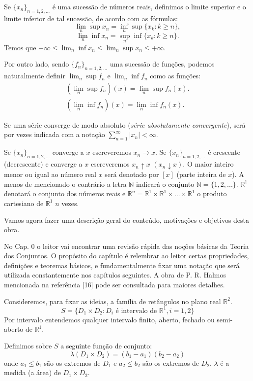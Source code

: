 \documentclass[
]{book}
\begin{document}
Se \(\{x_n\}_{n=1,2,...}\) é uma sucessão de números reais, definimos o limite superior e o limite inferior de tal sucessão, de acordo com as fórmulas: \[ \lim_n \sup x_n = \inf_n \sup \{x_k : k \ge n\}, \] \[ \lim_n \inf x_n = \sup_n \inf \{x_k : k \ge n\}. \] Temos que \(-\infty \le \lim_n \inf x_n \le \lim_n \sup x_n \le +\infty\).

Por outro lado, sendo \(\{f_n\}_{n=1,2,...}\) uma sucessão de funções, podemos naturalmente definir \(\lim_n \sup f_n\) e \(\lim_n \inf f_n\) como as funções: \[\begin{gathered} (\lim_n \sup f_n)(x) = \lim_n \sup f_n(x). \\ (\lim_n \inf f_n)(x) = \lim_n \inf f_n(x). \end{gathered} \]

Se uma série converge de modo absoluto (\emph{série absolutamente convergente}), será por vezes indicada com a notação \(\sum\limits_{n=1}^{\infty} |x_n| < \infty\).

Se \(\{x_n\}_{n=1,2,...}\) converge a \(x\) escreveremos \(x_n \to x\). Se \(\{x_n\}_{n=1,2,...}\) é crescente (decrescente) e converge a \(x\) escreveremos \(x_n \uparrow x\) \((x_n \downarrow x)\). O maior inteiro menor ou igual ao número real \(x\) será denotado por \([x]\) (parte inteira de \(x\)). A menos de mencionado o contrário a letra \(\mathbb{N}\) indicará o conjunto \(\mathbb{N} = \{1, 2, ...\}\). \(\mathbb{R}^1\) denotará o conjunto dos números reais e \(\mathbb{R}^n = \mathbb{R}^1 \times \mathbb{R}^1 \times \dots \times \mathbb{R}^1\) o produto cartesiano de \(\mathbb{R}^1\) \(n\) vezes.

Vamos agora fazer uma descrição geral do conteúdo, motivações e objetivos desta obra.

No Cap. 0 o leitor vai encontrar uma revisão rápida das noções básicas da Teoria dos Conjuntos. O propósito do capítulo é relembrar ao leitor certas propriedades, definições e teoremas básicos, e fundamentalmente fixar uma notação que será utilizada constantemente nos capítulos seguintes. A obra de P. R. Halmos mencionada na referência {[}16{]} pode ser consultada para maiores detalhes.

Consideremos, para fixar as ideias, a família de retângulos no plano real \(\mathbb{R}^2\). \[ S = \{D_1 \times D_2: D_i \text{ é intervalo de } \mathbb{R}^1, i=1, 2\} \] Por intervalo entendemos qualquer intervalo finito, aberto, fechado ou semi-aberto de \(\mathbb{R}^1\).

Definimos sobre \(S\) a seguinte função de conjunto: \[ \lambda(D_1 \times D_2) = (b_1 - a_1)(b_2 - a_2) \] onde \(a_1 \le b_1\) são os extremos de \(D_1\) e \(a_2 \le b_2\) são os extremos de \(D_2\). \(\lambda\) é a medida (a área) de \(D_1 \times D_2\).
\end{document}
